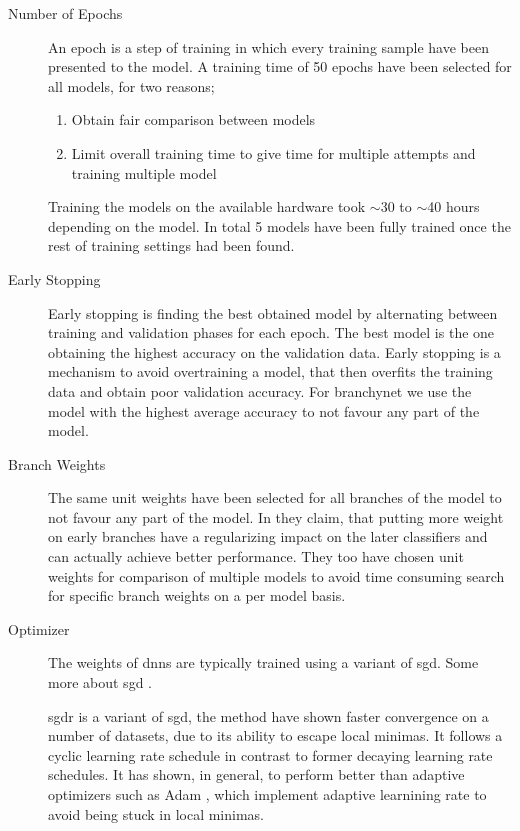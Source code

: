 \begin{description}
	\item[Number of Epochs] An epoch is a step of training in which every training sample have been presented to the model. A training time of 50 epochs have been selected for all models, for two reasons;
	
	\begin{enumerate}
		\item Obtain fair comparison between models
		\item Limit overall training time to give time for multiple attempts and training multiple model
	\end{enumerate}

	Training the models on the available hardware took $\sim$30 to  $\sim$40 hours depending on the model. In total 5 models have been fully trained once the rest of training settings had been found.
	
	\item[Early Stopping] Early stopping is finding the best obtained model by alternating between training and validation phases for each epoch. The best model is the one obtaining the highest accuracy on the validation data. Early stopping is a mechanism to avoid overtraining a model, that then overfits the training data and obtain poor validation accuracy. For \gls{branchynet} we use the model with the highest average accuracy to not favour any part of the model.  
	
	\item[Branch Weights] The same unit weights have been selected for all branches of the model to not favour any part of the model. In \cite{} they claim, that putting more weight on early branches have a regularizing impact on the later classifiers and can actually achieve better performance. They too have chosen unit weights for comparison of multiple models to avoid time consuming search for specific branch weights on a per model basis.
	  
	\item[Optimizer] The weights of \gls{dnn}s are typically trained using a variant of \gls{sgd}. Some more about \gls{sgd} \cite{goodfellow_deep_2016}.
	
	\gls{sgdr} \cite{loshchilov_sgdr:_2016} is a variant of \gls{sgd}, the method have shown faster convergence on a number of datasets, due to its ability to escape local minimas. It follows a cyclic learning rate schedule in contrast to former decaying learning rate schedules. It has shown, in general, to perform better than adaptive optimizers such as Adam \cite{kingma_adam:_2014}, which implement adaptive learnining rate to avoid being stuck in local minimas. 
	

\end{description}
